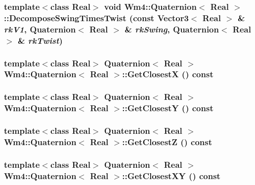 \subsubsection{\setlength{\rightskip}{0pt plus 5cm}template$<$class Real$>$ void {\bf Wm4::Quaternion}$<$ Real $>$::Decompose\-Swing\-Times\-Twist (const {\bf Vector3}$<$ Real $>$ \& {\em rk\-V1}, {\bf Quaternion}$<$ Real $>$ \& {\em rk\-Swing}, {\bf Quaternion}$<$ Real $>$ \& {\em rk\-Twist})}\label{classWm4_1_1Quaternion_9a117c3e9c8acbd6e7ae26a22bfdaf5c}


\subsubsection{\setlength{\rightskip}{0pt plus 5cm}template$<$class Real$>$ {\bf Quaternion}$<$ Real $>$ {\bf Wm4::Quaternion}$<$ Real $>$::Get\-Closest\-X () const}\label{classWm4_1_1Quaternion_d3e96bd350970366fcb2b0a09d984d10}


\subsubsection{\setlength{\rightskip}{0pt plus 5cm}template$<$class Real$>$ {\bf Quaternion}$<$ Real $>$ {\bf Wm4::Quaternion}$<$ Real $>$::Get\-Closest\-Y () const}\label{classWm4_1_1Quaternion_a2dd5d70dfd5f26a3024291474a6df66}


\subsubsection{\setlength{\rightskip}{0pt plus 5cm}template$<$class Real$>$ {\bf Quaternion}$<$ Real $>$ {\bf Wm4::Quaternion}$<$ Real $>$::Get\-Closest\-Z () const}\label{classWm4_1_1Quaternion_98ca51298f16fbb7223a9405b911970b}


\subsubsection{\setlength{\rightskip}{0pt plus 5cm}template$<$class Real$>$ {\bf Quaternion}$<$ Real $>$ {\bf Wm4::Quaternion}$<$ Real $>$::Get\-Closest\-XY () const}\label{classWm4_1_1Quaternion_e4b6087226aa6fc3ce6c7458b7d3bbbf}



